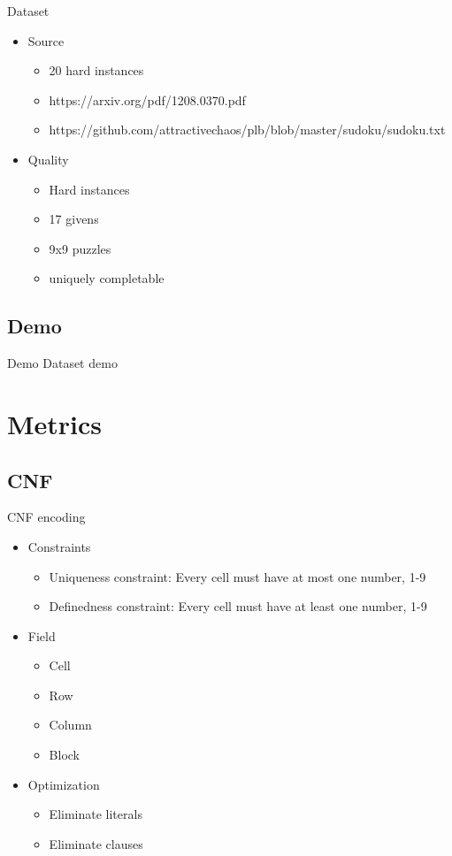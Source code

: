 \documentclass[11pt]{beamer}
\begin{document}
\begin{frame}{Dataset}
\begin{itemize}
\item Source
\begin{itemize}
\item 20 hard instances
\item https://arxiv.org/pdf/1208.0370.pdf
\item https://github.com/attractivechaos/plb/blob/master/sudoku/sudoku.txt
\end{itemize}
\item Quality
\begin{itemize}
\item Hard instances
\item 17 givens
\item 9x9 puzzles
\item uniquely completable
\end{itemize}
\end{itemize}
\end{frame}

\subsection{Demo}
\begin{frame}{Demo}
Dataset demo
\end{frame}

\section{Metrics}


\subsection{CNF}
\begin{frame}{CNF encoding}
\begin{itemize}
\item Constraints
\begin{itemize}
\item Uniqueness constraint: Every cell must have at most one number, 1-9
\item Definedness constraint: Every cell must have at least one number, 1-9
\end{itemize}
\item Field
\begin{itemize}
\item Cell
\item Row
\item Column
\item Block
\end{itemize}
\item Optimization
\begin{itemize}
\item Eliminate literals
\item Eliminate clauses
\end{itemize}
\end{itemize}
\end{frame}
\end{document}
